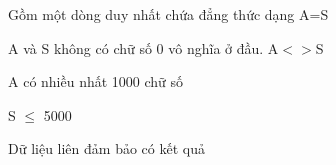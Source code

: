 Gồm một dòng duy nhất chứa đẳng thức dạng A=S  

   A và S không có chữ số 0 vô nghĩa ở đầu. A$<$$>$S  

   A có nhiều nhất 1000 chữ số  

   S $\le$ 5000  

   Dữ liệu liên đảm bảo có kết quả
